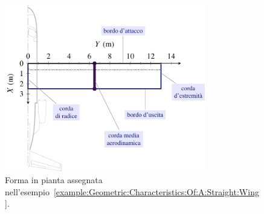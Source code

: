 \documentclass[[12pt,twoside]{book}
\begin{document}
\begin{figure}[t]%
  \centering
    \includegraphics[width=0.78\textwidth]{Chapter_2/geometric_characteristics_of_a_straight_wing/wing_planform_basic_0_drawing.pdf}%
  \caption{
           Forma in pianta assegnata nell'esempio~\ref{example:Geometric:Characteristics:Of:A:Straight:Wing}.}
  \label{fig:Wing:Planform:Basic:Drawing:AA}%
\end{figure}
%
%

%
\end{document}
